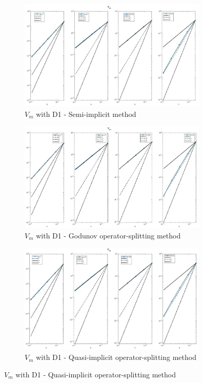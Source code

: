 \documentclass[a4paper,11pt]{article}
\begin{document}
\newpage
{} 
\begin{figure}[h]  \captionsetup{size = large} \caption{Comparison of $V_m$ and $\phi_i$ errors between different time-discretization schemes} \label{Vm-time}
\begin{subfigure}{0.5\textwidth}
\includegraphics[width = 9cm]{./D1_Vm_1.jpg}
\caption*{$V_m$ with D1 - Semi-implicit method}
\end{subfigure}
\begin{subfigure}{0.5\textwidth}
\includegraphics[width =9cm]{./D1_Vm_1_GO.jpg}
\caption*{$V_m$ with D1 - Godunov operator-splitting method}
\end{subfigure}
\begin{center}
\begin{subfigure}{0.5\textwidth}
\includegraphics[width =9cm]{./D1_Vm_1_OS.jpg}
\caption*{$V_m$ with D1 - Quasi-implicit operator-splitting method}
\end{subfigure}

\end{center}
\end{figure}
\end{document}
